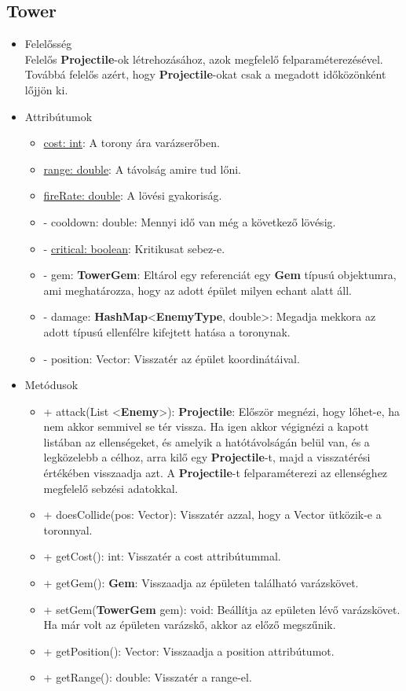 \subsection{Tower}
\begin{itemize}
\item Felelősség\\
Felelős \textbf{Projectile}-ok létrehozásához, azok megfelelő felparaméterezésével. Továbbá felelős azért, hogy \textbf{Projectile}-okat csak a megadott időközönként lőjjön ki.
\item Attribútumok
	\begin{itemize}
		\item \underline{cost: int}: A torony ára varázserőben.
		\item  \underline{range: double}: A távolság amire tud lőni.
		\item \underline{fireRate: double}: A lövési gyakoriság.
		\item - cooldown: double: Mennyi idő van még a következő lövésig.
		\item - \underline{critical: boolean}: Kritikusat sebez-e.
		\item - gem: \textbf{TowerGem}: Eltárol egy referenciát egy \textbf{Gem} típusú objektumra, ami meghatározza, hogy az adott épület milyen echant alatt áll.
		\item - damage: \textbf{HashMap}<\textbf{EnemyType}, double>: Megadja mekkora az adott típusú ellenfélre kifejtett hatása a toronynak.
		\item - position: Vector: Visszatér az épület koordinátáival.
	\end{itemize}
\item Metódusok
	\begin{itemize}
		\item + attack(List <\textbf{Enemy}>): \textbf{Projectile}: Először megnézi, hogy lőhet-e, ha nem akkor semmivel se tér vissza. Ha igen akkor végignézi a kapott listában az ellenségeket, és amelyik a hatótávolságán belül van, és a legközelebb a célhoz, arra kilő egy \textbf{Projectile}-t, majd a visszatérési értékében visszaadja azt. A \textbf{Projectile}-t felparaméterezi az ellenséghez megfelelő sebzési adatokkal.
		\item + doesCollide(pos: Vector): Visszatér azzal, hogy a Vector ütközik-e a toronnyal.
		\item + getCost(): int: Visszatér a cost attribútummal.
		\item + getGem(): \textbf{Gem}: Visszaadja az épületen található varázskövet.
		\item + setGem(\textbf{TowerGem} gem): void: Beállítja az epületen lévő varázskövet. Ha már volt az épületen varázskő, akkor az előző megszűnik.
		\item + getPosition(): Vector: Visszaadja a position attribútumot.
		\item + getRange(): double: Visszatér a range-el. 
	\end{itemize}
\end{itemize}


